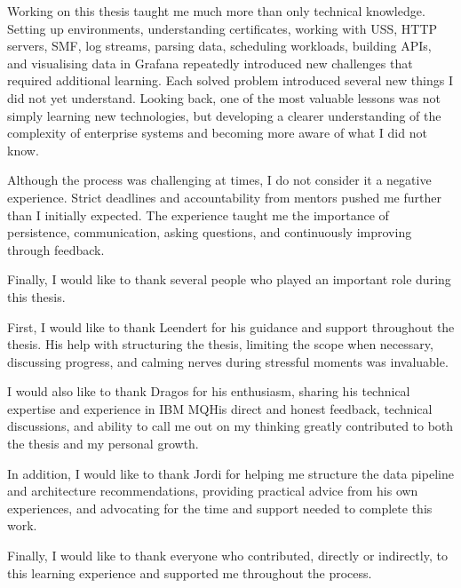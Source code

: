 Working on this thesis taught me much more than only technical knowledge. 
Setting up environments, understanding certificates, working with USS, HTTP servers, SMF, log streams, parsing data, 
scheduling workloads, building APIs, and visualising data in Grafana repeatedly introduced new challenges that required additional learning. 
Each solved problem introduced several new things I did not yet understand. 
Looking back, one of the most valuable lessons was not simply learning new technologies, 
but developing a clearer understanding of the complexity of enterprise systems and becoming more aware of what I did not know.

Although the process was challenging at times, I do not consider it a negative experience. Strict deadlines and accountability from 
mentors pushed me further than I initially expected.  
The experience taught me the importance of persistence, communication, asking questions, and continuously improving through feedback.

Finally, I would like to thank several people who played an important role during this thesis.

First, I would like to thank Leendert for his guidance and support throughout the thesis. 
His help with structuring the thesis, limiting the scope when necessary, discussing progress, 
and calming nerves during stressful moments was invaluable.

I would also like to thank Dragos for his enthusiasm, sharing his technical expertise and experience in IBM MQ\@ His direct and honest feedback, technical discussions, and ability to call me out on my thinking greatly contributed to both the thesis and my personal growth.

In addition, I would like to thank Jordi for helping me structure the data pipeline and architecture recommendations, providing practical advice from his 
own experiences, and advocating for the time and support needed to complete this work.

Finally, I would like to thank everyone who contributed, directly or indirectly, to this learning experience and supported me throughout the process.